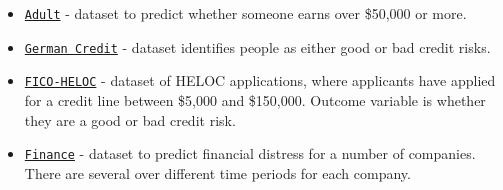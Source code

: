 \begin{itemize}
	\item \href{https://archive.ics.uci.edu/dataset/2/adult}{\texttt{Adult}} - dataset to predict whether someone earns over \$50,000 or more.
	\item \href{https://archive.ics.uci.edu/dataset/144/statlog+german+credit+data}{\texttt{German Credit}} - dataset identifies people as either good or bad credit risks.
	\item \href{https://community.fico.com/s/explainable-machine-learning-challenge}{\texttt{FICO-HELOC}} - dataset of HELOC applications, where applicants have applied for a credit line between \$5,000 and \$150,000. Outcome variable is whether they are a good or bad credit risk.
	\item \href{https://www.kaggle.com/datasets/shebrahimi/financial-distress}{\texttt{Finance}} - dataset to predict financial distress for a number of companies. There are several over different time periods for each company.
\end{itemize}



